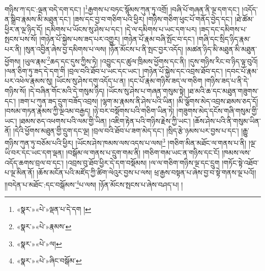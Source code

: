 གཉིས་ཀ་དང་:ལྡན་བདེ་དག་དང་། །\footnote{«སྣར་»«པེ་»ལྡན་པ་དེ་དག །}རྒྱགས་པ་བཏང་སྙོམས་ཀུན་ཏུ་འགྲོ། །བཞི་པོ་གཞན་ནི་ལྔ་དག་དང་། །འདོད་ན་སྒྲིབ་རྣམས་མི་མཐུན་དང་། །ཟས་དང་བྱ་བ་གཅིག་པའི་ཕྱིར། །གཉིས་གཅིག་ཕུང་པོ་གནོད་བྱེད་དང་། །ཐེ་ཚོམ་ཕྱིར་ན་ལྔ་ཉིད་དོ། །དམིགས་པ་ཡོངས་སུ་ཤེས་པ་དང་། །དེ་ལ་དམིགས་པ་ཡང་དག་པར། །ཟད་དང་དམིགས་པ་སྤངས་པས་སོ། །གཉེན་པོ་སྐྱེས་པས་ཟད་པར་འགྱུར། །གཉེན་པོ་རྣམ་བཞི་སྤོང་བ་དང་། །གཞི་དང་སྲིད་ཉིད་རྣམ་པར་ནི། །སུན་འབྱིན་ཞེས་བྱ་དམིགས་པ་ལས། །ཉོན་མོངས་པ་ནི་སྤང་བྱར་འདོད། །མཚན་ཉིད་མི་མཐུན་མི་མཐུན་ཕྱོགས། །ཡུལ་རྣམ་\footnote{«སྣར་»«པེ་»རྣམས་}ཆད་དང་དུས་ཀྱིས་ཏེ། །འབྱུང་དང་ཚུལ་ཁྲིམས་ཕྱོགས་དང་ནི། །དུས་གཉིས་རིང་བ་ཉིད་ལྟ་བུའོ། །ལན་ཅིག་ཏུ་ཟད་དེ་དག་གི །བྲལ་བའི་ཐོབ་པ་ཡང་དང་ཡང་། །གཉེན་པོ་སྐྱེས་དང་འབྲས་ཐོབ་དང་། །དབང་པོ་རྣམ་པར་འཕེལ་རྣམས་སུ། །ཡོངས་སུ་ཤེས་དགུ་འདོད་པ་ན། །དང་པོ་རྣམ་གཉིས་ཟད་ལ་གཅིག །གཉིས་ཟད་པ་ནི་དེ་གཉིས་སོ། །དེ་བཞིན་གོང་མའི་དེ་གསུམ་ཉིད། །ཡོངས་སུ་ཤེས་པ་གཞན་གསུམ་སྟེ། །ཐ་མའི་ཆ་དང་མཐུན་གཟུགས་དང་། །ཟག་པ་ཀུན་ཟད་དྲུག་བཟོད་འབྲས། །ལྷག་མ་རྣམས་ནི་ཤེས་པའི་ཡིན། །མི་ལྕོགས་མེད་འབྲས་ཐམས་ཅད་དོ། །བསམ་གཏན་རྣམས་ཀྱི་ལྔའམ་བརྒྱད། །ཉེ་བར་བསྡོགས་པའི་གཅིག་ཡིན་ཏེ། །གཟུགས་མེད་དངོས་གཞི་གསུམ་གྱི་ཡང་། །ཐམས་ཅད་འཕགས་པའི་ལམ་གྱི་ཡིན། །འཇིག་རྟེན་པའི་གཉིས་རྗེས་ཀྱི་ཡང་། །ཆོས་ཤེས་པའི་ནི་གསུམ་ཡིན་ནོ། །དེའི་ཕྱོགས་མཐུན་གྱི་དྲུག་དང་ལྔ། །བྲལ་བའི་ཐོབ་པ་ཟག་མེད་དང་། །སྲིད་རྩེ་ཉམས་པར་བྱས་པ་དང་། །རྒྱུ་གཉིས་ཀུན་ཏུ་བཅོམ་པའི་ཕྱིར། །ཡོངས་ཤེས་ཁམས་ལས་འདས་པ་ལས།\footnote{«སྣར་»«པེ་»ལ།} །གཅིག་མིན་མཐོང་ལ་གནས་པ་ནི། །ལྔ་ཡི་བར་དང་ཡང་དག་ལྡན། །བསྒོམ་ལ་གནས་པ་དྲུག་གམ་ནི། །གཅིག་གམ་ཡང་ན་གཉིས་དང་ངོ། །ཁམས་ལས་འདོད་ཆགས་བྲལ་བ་དང་། །འབྲས་བུ་ཐོབ་ཕྱིར་དེ་དག་བསྡོམས། །ལ་ལ་གཅིག་གཉིས་ལྔ་དང་དྲུག །གཏོང་སྟེ་འཐོབ་པ་ལྔ་མིན་ནོ། །ཆོས་མངོན་པའི་མཛོད་ཀྱི་ཚིག་ལེའུར་བྱས་པ་ལས། ཕྲ་རྒྱས་བསྟན་པ་ཞེས་བྱ་བ་སྟེ་གནས་ལྔ་པའོ།། །།བདེན་པ་མཐོང་:དང་བསྒོམས་\footnote{«སྣར་»«པེ་»ཞིང་བསྒོམ་}པ་ལས། །ཉོན་མོངས་སྤངས་པ་ཞེས་བཤད་པ། །
